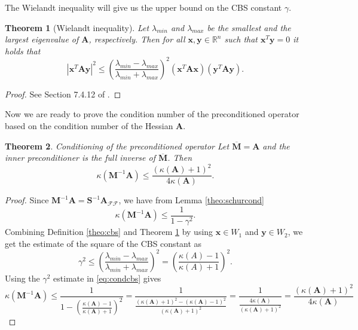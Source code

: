 \documentclass[11pt]{article}
\theoremstyle{plain}
\newtheorem{theorem}{Theorem}[section]
\theoremstyle{definition}
\newcommand{\Vx}{\bm{x}}
\newcommand{\Vy}{\bm{y}}
\newcommand{\MA}{\bm{A}}
\newcommand{\MM}{\bm{M}}
\newcommand{\MS}{\bm{S}}
\begin{document}
The Wielandt inequality \cite{Wielandt1953} will give us the upper bound on the CBS constant $\gamma$.
\begin{theorem}[Wielandt inequality]
  \label{theo:wielandt}
  Let $\lambda_{min}$ and $\lambda_{max}$ be the smallest and the largest eigenvalue of $\MA$, respectively. Then for all $\Vx, \Vy \in \mathbb{R}^{n}$ such that $\Vx^{T}\Vy = 0$ it holds that
  \begin{equation*}
    |\Vx^T \MA \Vy|^{2} \leq \left( \frac{\lambda_{min}-\lambda_{max}}{\lambda_{min}+\lambda_{max}} \right)^{2} \left( \Vx^{T}\MA\Vx \right) \left( \Vy^{T} \MA \Vy \right).
  \end{equation*}
\end{theorem}
\begin{proof}
 See Section 7.4.12 of \cite{Horn2012}.
\end{proof}

Now we are ready to prove the condition number of the preconditioned operator based on the condition number of the Hessian $\MA$.
\begin{theorem}{Conditioning of the preconditioned operator}
  \label{theo:precond}
  Let $\overline{\MM} = \MA$ and the inner preconditioner is the full inverse of $\overline{\MM}$. Then
    \begin{equation*}
      \kappa\left(\MM^{-1}\MA\right) \leq \frac{\left( \kappa\left( \MA \right) +1  \right)^{2}}{4\kappa(\MA)}.
    \end{equation*}
\end{theorem}
\begin{proof}
  Since $\MM^{-1} \MA = \MS^{-1}\MA_{\mathcal{FF}}$, we have from Lemma \ref{theo:schurcond}
  \begin{equation}
    \label{eq:condcbs}
    \kappa\left(\MM^{-1}\MA\right) \leq \frac{1}{1-\gamma^{2}}.
  \end{equation}
  Combining Definition \ref{theo:cbs} and Theorem \ref{theo:wielandt} by using $\Vx \in W_1$ and $\Vy \in W_2$, we get the estimate of the square of the CBS constant as
  \begin{equation*}
    \gamma^{2} \leq \left( \frac{\lambda_{min}-\lambda_{max}}{\lambda_{min}+\lambda_{max}} \right)^{2} = \left(\frac{\kappa(A)-1}{\kappa(A)+1}\right)^{2}.
  \end{equation*}
  Using the $\gamma^{2}$ estimate in \eqref{eq:condcbs} gives
  \begin{equation*}
    \kappa\left(\MM^{-1}\MA\right) \leq \frac{1}{1-\left(\frac{\kappa(\MA)-1}{\kappa(\MA)+1}\right)^{2}} = \frac{1}{\frac{\left(\kappa(\MA)+1\right)^{2} - \left(\kappa(\MA)-1\right)^{2}}{\left(\kappa(\MA)+1\right)^{2}}} = \frac{1}{\frac{4\kappa(\MA)}{\left(\kappa(\MA)+1\right)^{2}}} = \frac{\left( \kappa\left( \MA \right) +1  \right)^{2}}{4\kappa(\MA)}
  \end{equation*}
\end{proof}
\end{document}
